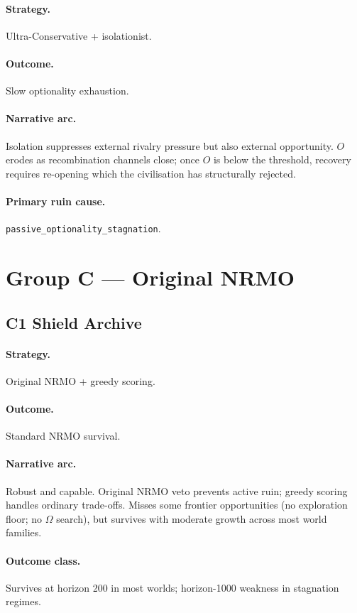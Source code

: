 \paragraph{Strategy.} Ultra-Conservative + isolationist.
\paragraph{Outcome.} Slow optionality exhaustion.
\paragraph{Narrative arc.}
Isolation suppresses external rivalry pressure but also
external opportunity. $O$ erodes as recombination channels close;
once $O$ is below the threshold, recovery requires re-opening
which the civilisation has structurally rejected.
\paragraph{Primary ruin cause.}
\texttt{passive\_optionality\_stagnation}.

\section{Group C --- Original NRMO}
\label{sec:civ-group-c}

\subsection{C1 Shield Archive}
\label{civ:c1}

\paragraph{Strategy.} Original NRMO + greedy scoring.
\paragraph{Outcome.} Standard NRMO survival.
\paragraph{Narrative arc.}
Robust and capable. Original NRMO veto prevents active ruin;
greedy scoring handles ordinary trade-offs. Misses some frontier
opportunities (no exploration floor; no $\Omega$ search), but
survives with moderate growth across most world families.
\paragraph{Outcome class.} Survives at horizon 200 in most worlds;
horizon-1000 weakness in stagnation regimes.

